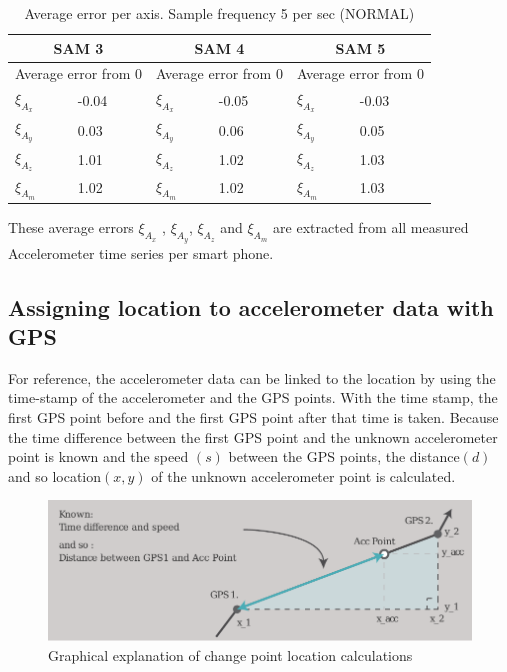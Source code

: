\renewcommand{\arraystretch}{1.5}
\renewcommand{\tabcolsep}{0.2cm}
\begin{table}[h]
\centering
\caption{Average error per axis. Sample frequency 5 per sec (NORMAL)}
\label{averageerror}
\begin{tabular}{|p{56.6pt}|p{56.6pt}|p{56.6pt}|p{56.6pt}|p{56.6pt}|p{56.6pt}|} 
\hline
\multicolumn{2}{|c|}{SAM 3} & \multicolumn{2}{|c|}{SAM 4} & \multicolumn{2}{|c|}{SAM 5} \\
\hline
\multicolumn{2}{|c|}{Average error from 0} & \multicolumn{2}{|c|}{Average error from 0} & \multicolumn{2}{|c|}{Average error from 0} \\ 
\hline
$\xi_{A_x}$ & -0.04 &$\xi_{A_x}$ & -0.05 &$\xi_{A_x}$ & -0.03 \\
$\xi_{A_y}$ & 0.03 & $\xi_{A_y}$ & 0.06 & $\xi_{A_y}$ & 0.05 \\
$\xi_{A_z}$ & 1.01 & $\xi_{A_z}$ & 1.02 & $\xi_{A_z}$ & 1.03 \\
$\xi_{A_m}$ & 1.02 & $\xi_{A_m}$ & 1.02 & $\xi_{A_m}$ & 1.03 \\
\hline
\end{tabular}
\end{table}

These average errors $\xi_{A_x}$ , $\xi_{A_y}$, $\xi_{A_z}$ and $\xi_{A_m}$ are extracted from all measured Accelerometer time series per smart phone. 

\subsection{Assigning location to accelerometer data with GPS}\label{locationassigning}
For reference, the accelerometer data can be linked to the location by using the time-stamp of the accelerometer and the GPS points. With the time stamp, the first GPS point before and the first GPS point after that time is taken. Because the time difference between the first GPS point and the unknown accelerometer point is known and the speed $(s)$ between the GPS points, the distance$(d)$ and so location$(x,y)$ of the unknown accelerometer point is calculated. 

\begin{figure}[H]
\includegraphics[width=\textwidth]{img/M_location_calc.pdf}
\centering
\caption{Graphical explanation of change point location calculations \label{cpcalc}}
\end{figure}

